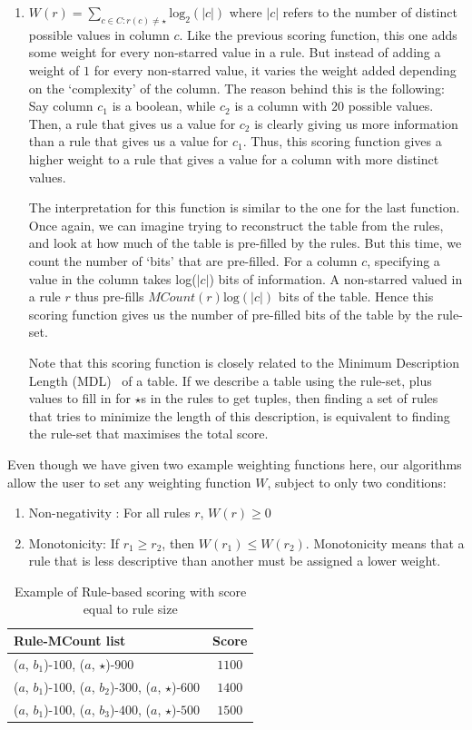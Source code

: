\documentclass{sig-alternate}
\begin{document}
\begin{enumerate}
\item $W(r) = \sum_{c \in C : r(c) \neq \star} \text{log}_2(|c|)$ where $|c|$ refers to the number of distinct possible values in column $c$. Like the previous scoring function, this one adds some weight for every non-starred value in a rule. But instead of adding a weight of $1$ for every non-starred value, it varies the weight added depending on the `complexity' of the column. The reason behind this is the following: Say column $c_1$ is a boolean, while $c_2$ is a column with $20$ possible values. Then, a rule that gives us a value for $c_2$ is clearly giving us more information than a rule that gives us a value for $c_1$. Thus, this scoring function gives a higher weight to a rule that gives a value for a column with more distinct values. 

The interpretation for this function is similar to the one for the last function. Once again, we can imagine trying to reconstruct the table from the rules, and look at how much of the table is pre-filled by the rules. But this time, we count the number of `bits' that are pre-filled. For a column $c$, specifying a value in the column takes log($|c|$) bits of information. A non-starred valued in a rule $r$ thus pre-fills $MCount(r) \text{log}(|c|)$ bits of the table. Hence this scoring function gives us the number of pre-filled bits of the table by the rule-set. 

Note that this scoring function is closely related to the Minimum Description Length (MDL)~\cite{Grunwald:2007:MDL:1213810} of a table. If we describe a table using the rule-set, plus values to fill in for $\star$s in the rules to get tuples, then finding a set of rules that tries to minimize the length of this description, is equivalent to finding the rule-set that maximises the total score. 
\end{enumerate}

Even though we have given two example weighting functions here, our algorithms allow the user to set any weighting function $W$, subject to only two conditions:
\begin{enumerate}
\item Non-negativity : For all rules $r$, $W(r) \geq 0$ 
\item Monotonicity: If $r_1 \geq r_2$, then $W(r_1) \leq W(r_2)$. Monotonicity means that a rule that is less descriptive than another must be assigned a lower weight.
\end{enumerate}

\begin{table}
\centering
\begin{tabular}{ | l | c | }
 \hline Rule-MCount list & Score \\ \hline
  ($a$, $b_1$)-$100$, ($a$, $\star$)-$900$ & $1100$ \\
  ($a$, $b_1$)-$100$, ($a$, $b_2$)-$300$, ($a$, $\star$)-$600$ & $1400$  \\
  ($a$, $b_1$)-$100$, ($a$, $b_3$)-$400$, ($a$, $\star$)-$500$ & $1500$ \\ \hline
\end{tabular}
\caption{Example of Rule-based scoring with score equal to rule size \label{table:sizescoringexample}}
\end{table}
\end{document}
